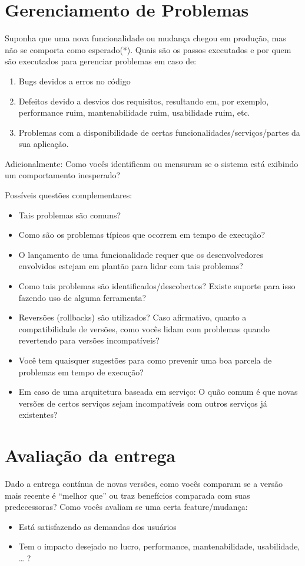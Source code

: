 \section{Gerenciamento de Problemas}
Suponha que uma nova funcionalidade ou mudança chegou em produção, mas não se comporta como esperado(*). Quais são os passos executados e por quem são executados para gerenciar problemas em caso de:
\begin{enumerate}
	\item Bugs devidos a erros no código
	\item Defeitos devido a desvios dos requisitos, resultando em, por exemplo, performance ruim, mantenabilidade ruim, usabilidade ruim, etc.
	\item Problemas com a disponibilidade de certas funcionalidades/serviços/partes da sua aplicação.
\end{enumerate}


Adicionalmente: Como vocês identificam ou mensuram se o sistema está exibindo um comportamento inesperado?

Possíveis questões complementares:
\begin{itemize}
	\item Tais problemas são comuns?
	\item Como são os problemas típicos que ocorrem em tempo de execução?
	\item O lançamento de uma funcionalidade requer que os desenvolvedores envolvidos estejam em plantão para lidar com tais problemas?
	\item Como tais problemas são identificados/descobertos? Existe suporte para isso fazendo uso de alguma ferramenta?
	\item Reversões (rollbacks) são utilizados? Caso afirmativo, quanto a compatibilidade de versões, como vocês lidam com problemas quando revertendo para versões incompatíveis?
	\item Você tem quaisquer sugestões para como prevenir uma boa parcela de problemas em tempo de execução?
	\item Em caso de uma arquitetura baseada em serviço: O quão comum é que novas versões de certos serviços sejam incompatíveis com outros serviços já existentes?
\end{itemize}

\section{Avaliação da entrega}
Dado a entrega contínua de novas versões, como vocês comparam se a versão mais recente é “melhor que” ou traz benefícios comparada com suas predecessoras? Como vocês avaliam se uma certa feature/mudança:
\begin{itemize}
	\item Está satisfazendo as demandas dos usuários
	\item Tem o impacto desejado no lucro, performance, mantenabilidade, usabilidade, … ?
\end{itemize}

